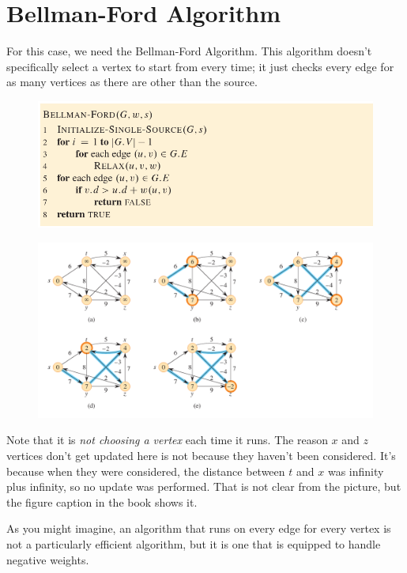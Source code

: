 \documentclass[]{article}
\begin{document}
\section*{Bellman-Ford Algorithm}

For this case, we need the Bellman-Ford Algorithm. This algorithm doesn't specifically select a vertex to start from every time; it just checks every edge for as many vertices as there are other than the source.


\begin{figure}[h]
    \includegraphics[width=\textwidth]{ssp-bellman-ford-pseudo.png}
\end{figure}

\begin{figure}[h]
    \includegraphics[width=\textwidth]{ssp-bellman-ford.png}
\end{figure}

Note that it is \textit{not choosing a vertex} each time it runs. The reason $x$ and $z$ vertices don't get updated here is not because they haven't been considered. It's because when they were considered, the distance between $t$ and $x$ was infinity plus infinity, so no update was performed. That is not clear from the picture, but the figure caption in the book shows it. 

As you might imagine, an algorithm that runs on every edge for every vertex is not a particularly efficient algorithm, but it is one that is equipped to handle negative weights. 
\end{document}
